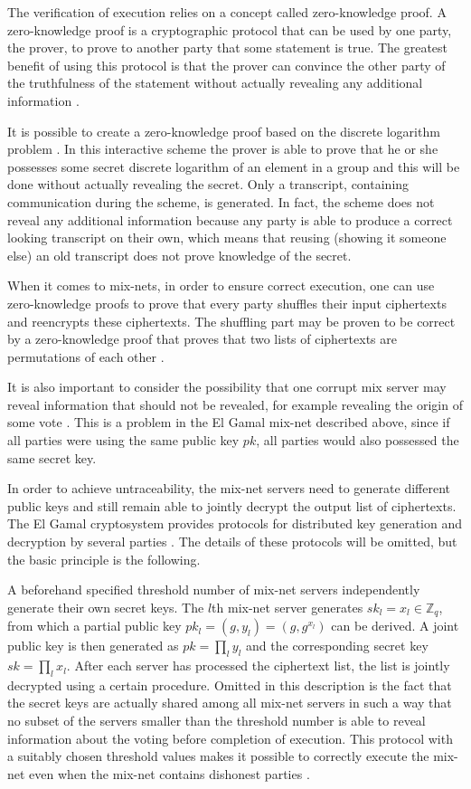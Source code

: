 The verification of execution relies on a concept called
zero-knowledge proof. A zero-knowledge proof is a cryptographic
protocol that can be used by one party, the prover, to prove to
another party that some statement is true. The greatest benefit of
using this protocol is that the prover can convince the other party of
the truthfulness of the statement without actually revealing any
additional information \cite{shoup}.

It is possible to create a zero-knowledge proof based on the discrete
logarithm problem \cite{shoup}. In this interactive scheme the prover
is able to prove that he or she possesses some secret discrete
logarithm of an element in a group and this will be done without
actually revealing the secret. Only a transcript, containing
communication during the scheme, is generated. In fact, the scheme
does not reveal any additional information because any party is able
to produce a correct looking transcript on their own, which means that
reusing (showing it someone else) an old transcript does not prove
knowledge of the secret.

When it comes to mix-nets, in order to ensure correct execution, one
can use zero-knowledge proofs to prove that every party shuffles their
input ciphertexts and reencrypts these ciphertexts. The shuffling part
may be proven to be correct by a zero-knowledge proof that proves that
two lists of ciphertexts are permutations of each other
\cite{terelius}.

It is also important to consider the possibility that one corrupt mix
server may reveal information that should not be revealed, for example
revealing the origin of some vote \cite{electronicvoting}. This is a
problem in the El Gamal mix-net described above, since if all parties
were using the same public key $pk$, all parties would also possessed
the same secret key.

In order to achieve untraceability, the mix-net servers need to
generate different public keys and still remain able to jointly
decrypt the output list of ciphertexts. The El Gamal cryptosystem
provides protocols for distributed key generation and decryption by
several parties \cite{wikstrom1}. The details of these protocols will
be omitted, but the basic principle is the following.

A beforehand specified threshold number of mix-net servers
independently generate their own secret keys. The $l$th mix-net server
generates $sk_l = x_l \in \mathbb{Z}_q$, from which a partial public key
$pk_l = (g,y_l) = (g,g^{x_l})$ can be derived. A joint public key is
then generated as $pk = \prod_l y_l$ and the corresponding secret key
$sk = \prod_l x_l$. After each server has processed the ciphertext
list, the list is jointly decrypted using a certain procedure. Omitted
in this description is the fact that the secret keys are actually
shared among all mix-net servers in such a way that no subset of the
servers smaller than the threshold number is able to reveal
information about the voting before completion of execution. This
protocol with a suitably chosen threshold values makes it possible to
correctly execute the mix-net even when the mix-net contains dishonest
parties \cite{wikstrom1}.


